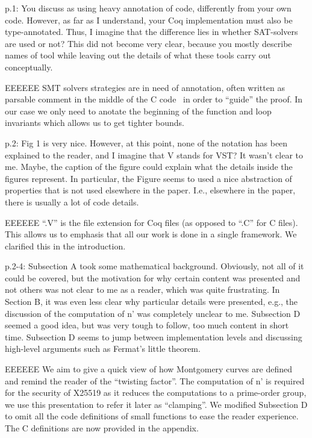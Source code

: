 p.1: You discuss \cite{Ber06} as using heavy annotation of code,
differently from your own code. However, as far as I understand,
your Coq implementation must also be type-annotated. Thus,
I imagine that the difference lies in whether SAT-solvers are
used or not? This did not become very clear, because you
mostly describe names of tool while leaving out the details of
what these tools carry out conceptually.

\begin{answer}{EEEEEE}
SMT solvers strategies are in need of annotation, often written
as parsable comment in the middle of the C code~\cite{acsl}
in order to ``guide'' the proof. In our case we only need to
anotate the beginning of the function and loop invariants
which allows us to get tighter bounds.
\end{answer}

p.2: Fig 1 is very nice. However, at this point, none of
the notation has been explained to the reader, and I imagine
that V stands for VST? It wasn't clear to me. Maybe, the
caption of the figure could explain what the details inside the
figures represent. In particular, the Figure seems to used a
nice abstraction of properties that is not used elsewhere in
the paper. I.e., elsewhere in the paper, there is usually a lot
of code details.

\begin{answer}{EEEEEE}
``.V'' is the file extension for Coq files (as opposed to ``.C'' for C
files). This allows us to emphasis that all our work is done
in a single framework. We clarified this in the introduction.
\end{answer}

p.2-4: Subsection A took some mathematical background.
Obviously, not all of it could be covered, but the motivation
for why certain content was presented and not others was not
clear to me as a reader, which was quite frustrating. In Section
B, it was even less clear why particular details were presented,
e.g., the discussion of the computation of n’ was completely
unclear to me. Subsection D seemed a good idea, but was very
tough to follow, too much content in short time. Subsection D
seems to jump between implementation levels and discussing
high-level arguments such as Fermat’s little theorem.

\begin{answer}{EEEEEE}
We aim to give a quick view of how Montgomery curves are
defined and remind the reader of the ``twisting factor''. The
computation of n' is required for the security of X25519 as
it reduces the computations to a prime-order group, we use
this presentation to refer it later as ``clamping''. We
modified Subsection D to omit all the code definitions of small
functions to ease the reader experience. The C definitions
are now provided in the appendix.
\end{answer}


